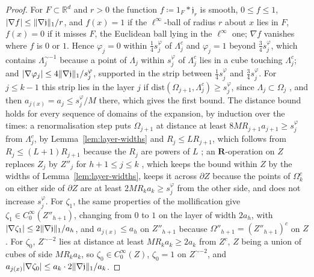 \documentclass[11pt]{preprint}
\DeclarePairedDelimiter{\abs}{\lvert}{\rvert}
\DeclarePairedDelimiter{\norm}{\lVert}{\rVert}
\numberwithin{equation}{section}
\theoremstyle{definition}
\theoremstyle{remark}
\theoremstyle{plain}
\begin{document}
\begin{proof}
For $F \subset \mathbb R^d$ and $r > 0$ the function $f \coloneqq 1_F * \mathfrak j_r$ is smooth, $0 \leq f \leq 1$, $\abs{\nabla f} \leq \norm{\nabla\mathfrak j}_1/r$, and $f(x) = 1$ if the $\ell^\infty$-ball of radius $r$ about $x$ lies in $F$, $f(x) = 0$ if it misses $F$, the Euclidean ball lying in the $\ell^\infty$ one; $\nabla f$ vanishes where $f$ is $0$ or $1$. Hence $\varphi_j = 0$ within $\frac14s^\varphi_j$ of $\Lambda_j^c$ and $\varphi_j = 1$ beyond $\frac34s^\varphi_j$, which contains $\Lambda_j^{\sim-1}$ because a point of $\Lambda_j$ within $s^\varphi_j$ of $\Lambda_j^c$ lies in a cube touching $\Lambda_j^c$; and $\abs{\nabla\varphi_j} \leq 4\norm{\nabla\mathfrak j}_1/s^\varphi_j$, supported in the strip between $\frac14s^\varphi_j$ and $\frac34s^\varphi_j$. For $j \leq k - 1$ this strip lies in the layer $j$ if $\mathrm{dist}(\Omega_{j+1}, \Lambda_j^c) \geq s^\varphi_j$, since $\Lambda_j \subset \Omega_j$ \cite[(2.1)]{BalabanCRE}, and then $a_{j(x)} = a_j \leq s^\varphi_j/M$ there, which gives the first bound. The distance bound holds for every sequence of domains of the expansion, by induction over the times: a renormalisation step puts $\Omega_{j+1}$ at distance at least $8MR_{j+1}a_{j+1} \geq s^\varphi_j$ from $\Lambda_j^c$, by Lemma~\ref{lem:layer-widths} and $R_j \leq LR_{j+1}$, which follows from $R_j \leq (L + 1)R_{j+1}$ \cite[(2.9), p.~256]{BalabanCRE} because the $R_j$ are powers of $L$ \cite[(2.5)]{BalabanCRE}; an $\mathbf R$-operation on $Z$ replaces $Z_j$ by $Z''_j$ for $h + 1 \leq j \leq k$ \cite[(1.10)--(1.12), p.~179]{BalabanLFR1}, which keeps the bound within $Z$ by the widths of Lemma~\ref{lem:layer-widths}, keeps it across $\partial Z$ because the points of $\Omega_k^c$ on either side of $\partial Z$ are at least $2MR_ka_k \geq s^\varphi_j$ from the other side, and does not increase $s^\varphi_j$. For $\zeta_1$, the same properties of the mollification give $\zeta_1 \in C_0^\infty(Z''_{h+1})$, changing from $0$ to $1$ on the layer of width $2a_h$, with $\abs{\nabla\zeta_1} \leq 2\norm{\nabla\mathfrak j}_1/a_h$, and $a_{j(x)} \leq a_h$ on $Z''_{h+1}$ because $\Omega''_{h+1} = (Z''_{h+1})^c$ on $Z$ \cite[(1.12)]{BalabanLFR1}. For $\zeta_0$, $Z^{\sim-2}$ lies at distance at least $MR_ka_k \geq 2a_k$ from $Z^c$, $Z$ being a union of cubes of side $MR_ka_k$, so $\zeta_0 \in C_0^\infty(Z)$, $\zeta_0 = 1$ on $Z^{\sim-2}$, and $a_{j(x)}\abs{\nabla\zeta_0} \leq a_k \cdot 2\norm{\nabla\mathfrak j}_1/a_k$.
\end{proof}
\end{document}
